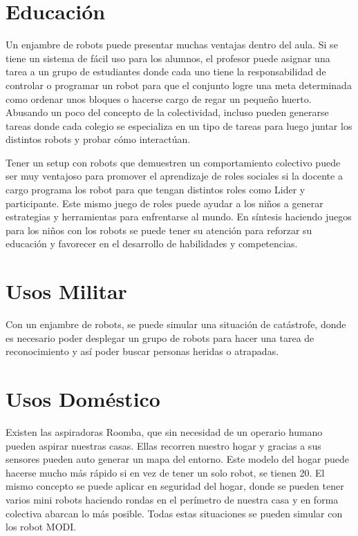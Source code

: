 \section{Educación}

Un enjambre de robots puede presentar muchas ventajas dentro del aula. Si se tiene un sistema de fácil uso para los alumnos, el profesor puede asignar una tarea a un grupo de estudiantes donde cada uno tiene la responsabilidad de controlar o programar un robot para que el conjunto logre una meta determinada como ordenar unos bloques o hacerse cargo de regar un pequeño huerto. Abusando un poco del concepto de la colectividad, incluso pueden generarse tareas donde cada colegio se especializa en un tipo de tareas para luego juntar los distintos robots y probar cómo interactúan.

Tener un setup con robots que demuestren un comportamiento colectivo puede ser muy ventajoso para promover el aprendizaje de roles sociales si la docente a cargo programa los robot para que tengan distintos roles como Lider y participante. Este mismo juego de roles puede ayudar a los niños a generar estrategias y herramientas para enfrentarse al mundo. En síntesis haciendo juegos para los niños con los robots se puede tener su atención para reforzar su educación y favorecer en el desarrollo de habilidades y competencias. 

\section{Usos Militar}

Con un enjambre de robots, se puede simular una situación de catástrofe, donde es necesario poder desplegar un grupo de robots para hacer una tarea de reconocimiento y así poder buscar personas heridas o atrapadas.

\section{Usos Doméstico}

Existen las aspiradoras Roomba, que sin necesidad de un operario humano pueden aspirar nuestras casas. Ellas recorren nuestro hogar y gracias a sus sensores pueden auto generar un mapa del entorno. Este modelo del hogar puede hacerse mucho más rápido si en vez de tener un solo robot, se tienen 20. El mismo concepto se puede aplicar en seguridad del hogar, donde se pueden tener varios mini robots haciendo rondas en el perímetro de nuestra casa y en forma colectiva abarcan lo más posible. Todas estas situaciones se pueden simular con los robot MODI.
